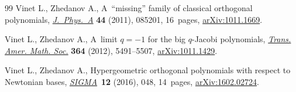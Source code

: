 \documentclass[10pt,a4paper]{amsart}
\numberwithin{equation}{section}
\begin{document}
\begin{thebibliography}{99}
Vinet L., Zhedanov A., A~``missing'' family of classical orthogonal
 polynomials,
 \href{https://doi.org/10.1088/1751-8113/44/8/085201}{\textit{J.~Phys.~A}}
 \textbf{44} (2011), 085201, 16~pages,
 \href{http://arxiv.org/abs/1011.1669}{arXiv:1011.1669}.

Vinet L., Zhedanov A., A~limit {$q=-1$} for the big {$q$}-{J}acobi polynomials,
 \href{https://doi.org/10.1090/S0002-9947-2012-05539-5}{\textit{Trans. Amer.
 Math. Soc.}} \textbf{364} (2012), 5491--5507,
 \href{http://arxiv.org/abs/1011.1429}{arXiv:1011.1429}.

Vinet L., Zhedanov A., Hypergeometric orthogonal polynomials with respect to
 {N}ewtonian bases,
 \href{https://doi.org/10.3842/SIGMA.2016.048}{\textit{SIGMA}}~\textbf{12}
 (2016), 048, 14~pages,
 \href{http://arxiv.org/abs/1602.02724}{arXiv:1602.02724}.

\end{thebibliography}
\end{document}
